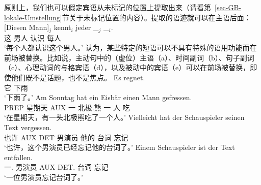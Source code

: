 原则上，我们也可以假定宾语从未标记的位置上提取出来（请看第~\ref{sec-GB-lokale-Umstellung}节关于未标记位置的内容）。提取的语迹就可以在主语后面：
\ea
\label{Beispiel-Diesen-Mann-kent-jeder-trace-follows-subjectHPSG}
\gll {}[Diesen Mann]$_j$ kennt$_i$ jeder \_$_j$  \_$_i$.\\
	 {}\spacebr{}这 男人 认识 每人 {}\\
\glt `每个人都认识这个男人。'
\z
\citet{Fanselow2004c}认为，某些特定的短语可以不具有特殊的语用功能而在前场被替换。比如说，主动句中的（虚位）主语（a）、时间副词（b）、句子副词（c）、心理动词的与格宾语（d），以及被动中的宾语（e）可以在前场被替换，即使他们既不是话题，也不是焦点。
\eal
\ex
\gll Es regnet.\\
     它 下雨\\
\glt `下雨了。'
\ex 
\gll Am Sonntag hat ein Eisbär einen Mann gefressen.\\
     PREP 星期天 AUX 一   北极.熊 一 人 吃\\
\glt `在星期天，有一头北极熊吃了一个人。'
\ex 
\gll Vielleicht hat der Schauspieler seinen Text vergessen.\\
     也许    AUX DET 男演员 他的 台词 忘记\\
\glt `也许，这个男演员已经忘记他的台词了。'
\ex 
\gll Einem Schauspieler ist der Text entfallen.\\
     一.\dat{} 男演员 AUX DET.\nom{} 台词 忘记\\
\glt `一位男演员忘记台词了。'

